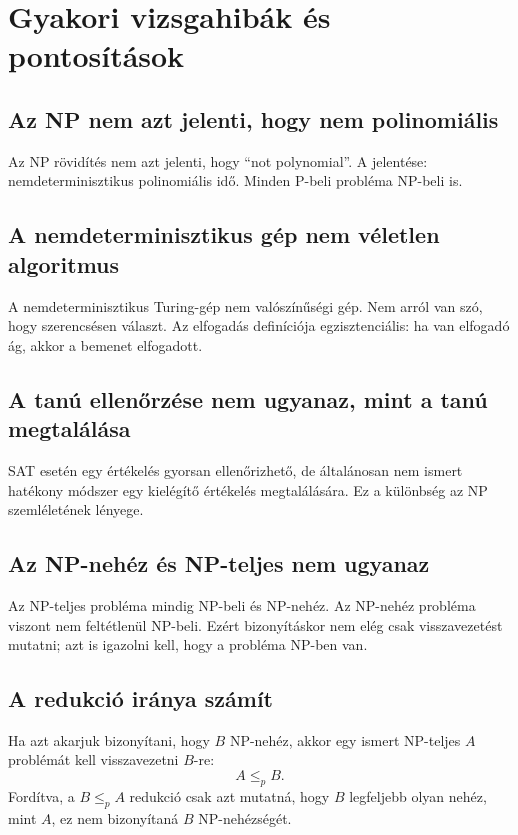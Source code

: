 \section{Gyakori vizsgahibák és pontosítások}

\subsection{Az NP nem azt jelenti, hogy nem polinomiális}

Az $\mathrm{NP}$ rövidítés nem azt jelenti, hogy ``not polynomial''. A jelentése: nemdeterminisztikus polinomiális idő. Minden $\mathrm{P}$-beli probléma $\mathrm{NP}$-beli is.

\subsection{A nemdeterminisztikus gép nem véletlen algoritmus}

A nemdeterminisztikus Turing-gép nem valószínűségi gép. Nem arról van szó, hogy szerencsésen választ. Az elfogadás definíciója egzisztenciális: ha van elfogadó ág, akkor a bemenet elfogadott.

\subsection{A tanú ellenőrzése nem ugyanaz, mint a tanú megtalálása}

SAT esetén egy értékelés gyorsan ellenőrizhető, de általánosan nem ismert hatékony módszer egy kielégítő értékelés megtalálására. Ez a különbség az $\mathrm{NP}$ szemléletének lényege.

\subsection{Az NP-nehéz és NP-teljes nem ugyanaz}

Az NP-teljes probléma mindig $\mathrm{NP}$-beli és NP-nehéz. Az NP-nehéz probléma viszont nem feltétlenül $\mathrm{NP}$-beli. Ezért bizonyításkor nem elég csak visszavezetést mutatni; azt is igazolni kell, hogy a probléma $\mathrm{NP}$-ben van.

\subsection{A redukció iránya számít}

Ha azt akarjuk bizonyítani, hogy $B$ NP-nehéz, akkor egy ismert NP-teljes $A$ problémát kell visszavezetni $B$-re:
\[
  A\leq_p B.
\]
Fordítva, a $B\leq_p A$ redukció csak azt mutatná, hogy $B$ legfeljebb olyan nehéz, mint $A$, ez nem bizonyítaná $B$ NP-nehézségét.

